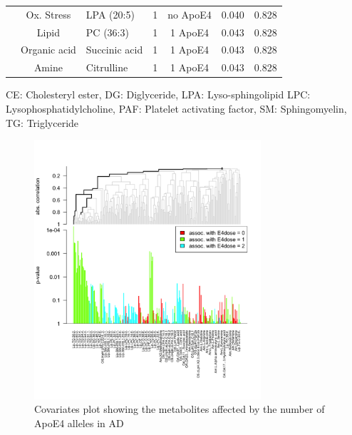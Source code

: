 \documentclass{amsart}
\begin{document}
\begin{table}
{\begin{threeparttable}
\begin{tabular}{cclccrr}
   & Ox. Stress & LPA (20:5) & 1 & no ApoE4 & 0.040 & 0.828 \\
   & Lipid & PC (36:3) & 1 & 1 ApoE4 & 0.043 & 0.828 \\
   & Organic acid & Succinic acid & 1 & 1 ApoE4 & 0.043 & 0.828 \\
   & Amine & Citrulline & 1 & 1 ApoE4 & 0.043 & 0.828 \\   \bottomrule  
  \end{tabular}
  \begin{tablenotes}
    \item[] CE: Cholesteryl ester, DG: Diglyceride, LPA: Lyso-sphingolipid LPC: Lysophosphatidylcholine, PAF: Platelet activating factor, SM: Sphingomyelin, TG: Triglyceride
  \end{tablenotes}
\end{threeparttable}}
  \end{table}


\begin{figure}[H]
    \includegraphics[width=0.75\textwidth]{figures/gt2.png}
      \caption{Covariates plot showing the metabolites affected by the number of ApoE4 alleles in AD}
    \label{plot:gt}
  \end{figure}
\clearpage  
\end{document}
